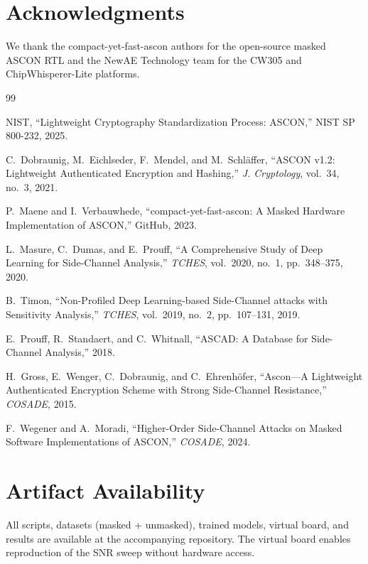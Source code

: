 \documentclass[a4paper,11pt,twocolumn]{article}
\begin{document}
\section*{Acknowledgments}

We thank the compact-yet-fast-ascon authors for the open-source masked ASCON RTL and the NewAE Technology team for the CW305 and ChipWhisperer-Lite platforms.


\begin{thebibliography}{99}

NIST, ``Lightweight Cryptography Standardization Process: ASCON,'' NIST SP 800-232, 2025.

C.~Dobraunig, M.~Eichlseder, F.~Mendel, and M.~Schl\"affer, ``ASCON v1.2: Lightweight Authenticated Encryption and Hashing,'' \emph{J. Cryptology}, vol.~34, no.~3, 2021.

P.~Maene and I.~Verbauwhede, ``compact-yet-fast-ascon: A Masked Hardware Implementation of ASCON,'' GitHub, 2023.

L.~Masure, C.~Dumas, and E.~Prouff, ``A Comprehensive Study of Deep Learning for Side-Channel Analysis,'' \emph{TCHES}, vol.~2020, no.~1, pp.~348--375, 2020.

B.~Timon, ``Non-Profiled Deep Learning-based Side-Channel attacks with Sensitivity Analysis,'' \emph{TCHES}, vol.~2019, no.~2, pp.~107--131, 2019.

E.~Prouff, R.~Standaert, and C.~Whitnall, ``ASCAD: A Database for Side-Channel Analysis,'' 2018.

H.~Gross, E.~Wenger, C.~Dobraunig, and C.~Ehrenh\"ofer, ``Ascon---A Lightweight Authenticated Encryption Scheme with Strong Side-Channel Resistance,'' \emph{COSADE}, 2015.

F.~Wegener and A.~Moradi, ``Higher-Order Side-Channel Attacks on Masked Software Implementations of ASCON,'' \emph{COSADE}, 2024.

\end{thebibliography}

\section*{Artifact Availability}

All scripts, datasets (masked + unmasked), trained models, virtual board, and results are available at the accompanying repository. The virtual board enables reproduction of the SNR sweep without hardware access.
\end{document}
